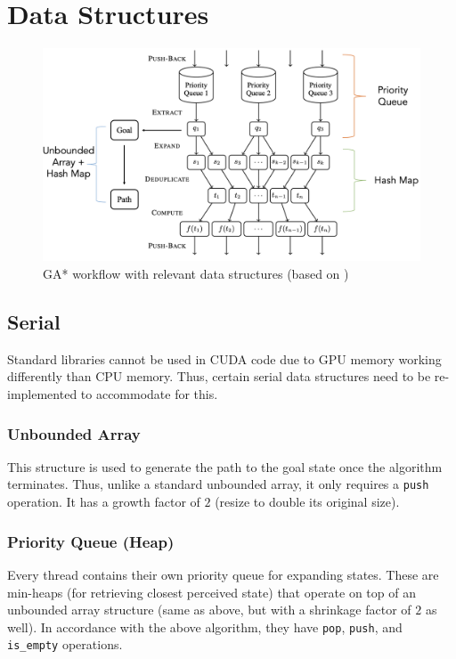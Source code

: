 \section{Data Structures}

\begin{figure}
    \centering
    \includegraphics[scale=0.5]{figures/gastar_ds.png}
    \caption{GA* workflow with relevant data structures (based on \cite{paper})}
    \label{fig:gastar_ds}
\end{figure}

\subsection{Serial}
Standard libraries cannot be used in CUDA code due to GPU memory working differently than CPU memory. Thus, certain serial data structures need to be re-implemented to accommodate for this.
\subsubsection{Unbounded Array}
This structure is used to generate the path to the goal state once the algorithm terminates. Thus, unlike a standard unbounded array, it only requires a \texttt{push} operation. It has a growth factor of $2$ (resize to double its original size).
\subsubsection{Priority Queue (Heap)}
Every thread contains their own priority queue for expanding states. These are min-heaps (for retrieving closest perceived state) that operate on top of an unbounded array structure (same as above, but with a shrinkage factor of $2$ as well). In accordance with the above algorithm, they have \texttt{pop}, \texttt{push}, and \texttt{is\_empty} operations.
